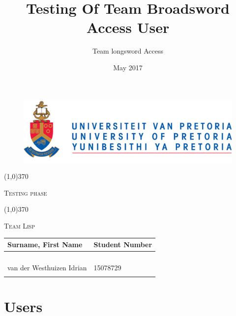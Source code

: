 \documentclass[english]{article}
\begin{document}
\title{Testing Of Team Broadsword Access User }
\author{Team longsword Access }
\date{May 2017}
\maketitle

	\begin{figure}
		\includegraphics[width=\linewidth]{up_logo.png}
	\end{figure}
	
	\begin{center}
	 \line(1,0){370}
	\\[0.2cm]
    	{\scshape\Large Testing phase  \par}
	\vspace{0.1cm}
	\line(1,0){370}
	\\[0.8cm]
	
	 {\scshape\Large Team Lisp \par}
	\vspace{0.9cm}
	
	\begin{tabu} to \textwidth { X[l] X[l]}
		\hline
		\textbf{Surname, First Name  }	& \textbf{Student Number}	\\ \hline \hline
		   &	\\ \hline
		  &	\\ \hline
		  &	\\ \hline
	    	 &	\\ \hline
		van der Westhuizen Idrian&15078729\\ \hline
		 &	\\ \hline
		\hline
	\end{tabu}
	
	\end{center}

	\newpage
	\tableofcontents

	\newpage

\section{Users}
\end{document}
